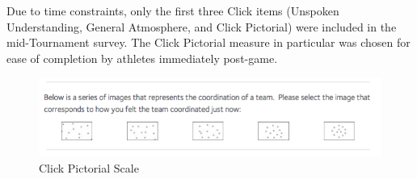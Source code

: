 Due to time constraints, only the first three Click items (Unspoken Understanding, General Atmosphere, and Click Pictorial) were included in the mid-Tournament survey. The Click Pictorial measure in particular was chosen for ease of completion by athletes immediately post-game. \\


\begin{figure}[htbp]
  \includegraphics[width = \linewidth]{images/teamClickPictorial.png}
  \caption{Click Pictorial Scale}
  \label{fig:clickPictorial}
\end{figure}





